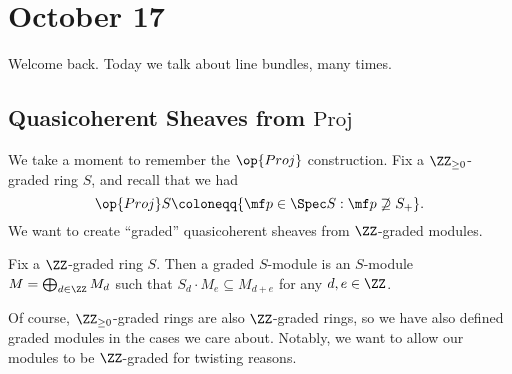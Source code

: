 \documentclass[../notes.tex]{subfiles}
\begin{document}
\section{October 17}

Welcome back. Today we talk about line bundles, many times.

\subsection{Quasicoherent Sheaves from \texorpdfstring{$\mathrm{Proj}$}{\textrm{Proj}}}
We take a moment to remember the $\op{Proj}$ construction. Fix a $\ZZ_{\ge0}$-graded ring $S$, and recall that we had
\[\op{Proj}S\coloneqq\{\mf p\in\Spec S:\mf p\not\supseteq S_+\}.\]
We want to create ``graded'' quasicoherent sheaves from $\ZZ$-graded modules.
\begin{definition}
	Fix a $\ZZ$-graded ring $S$. Then a graded $S$-module is an $S$-module $M=\bigoplus_{d\in\ZZ}M_d$ such that $S_d\cdot M_e\subseteq M_{d+e}$ for any $d,e\in\ZZ$.
\end{definition}
Of course, $\ZZ_{\ge0}$-graded rings are also $\ZZ$-graded rings, so we have also defined graded modules in the cases we care about. Notably, we want to allow our modules to be $\ZZ$-graded for twisting reasons.
\end{document}
